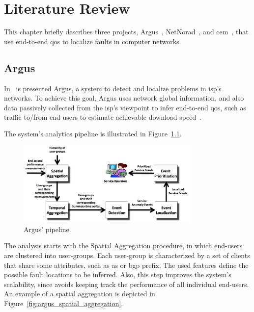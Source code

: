 \chapter{Literature Review}
\label{chap:literature_review}

This chapter briefly describes three projects,
Argus~\cite{argus_end_to_end_service_anomaly_detection_and_localization_from_an_isps_point_of_view},
NetNorad~\cite{netnorad},
and \gls*{cem}~\cite{crowdsourcing_service_level_network_event_monitoring},
that use end-to-end \gls*{qos} to localize faults in computer networks.

\section{Argus}

In~\cite{argus_end_to_end_service_anomaly_detection_and_localization_from_an_isps_point_of_view}
is presented Argus, a system to
detect and localize problems in \gls*{isp}'s networks. To achieve this goal,
Argus uses network global information, and also data passively collected
from the \gls*{isp}'s viewpoint to infer
end-to-end \gls*{qos}, such as traffic to/from end-users to estimate achievable
download
speed~\cite{speed_testing_without_speed_tests_estimating_achievable_download_speed_from_passive_measurements}.

The system's analytics pipeline is illustrated in
Figure~\ref{fig:argus_pipeline}.

\begin{figure}[H]
    \centering
    \includegraphics[width=0.8\textwidth]{./figures/literature_review/argus_pipeline.png}
    \caption{Argus' pipeline.~\cite{argus_end_to_end_service_anomaly_detection_and_localization_from_an_isps_point_of_view}}
\label{fig:argus_pipeline}
\end{figure}%

The analysis starts with the Spatial Aggregation procedure, in which
end-users are clustered into user-groups.
Each user-group is characterized by a set of clients that share some
attributes, such as \gls*{as} or \gls*{bgp} prefix.
The used features define the possible fault locations to be inferred.
Also, this step improves the system's
scalability, since avoids keeping track the performance of all individual
end-users.
An example of a spatial aggregation is depicted in
Figure~\ref{fig:argus_spatial_aggregation}.


